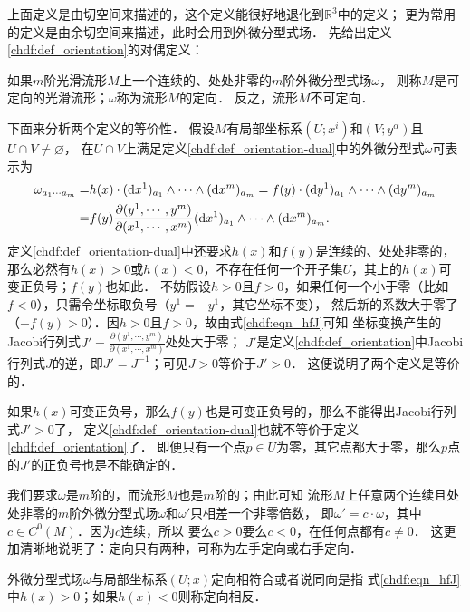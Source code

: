 上面定义是由切空间来描述的，这个定义能很好地退化到$\mathbb{R}^3$中的定义；
更为常用的定义是由余切空间来描述，此时会用到外微分型式场．
先给出定义\ref{chdf:def_orientation}的对偶定义：
\begin{definition}\label{chdf:def_orientation-dual}
    如果$m$阶光滑流形$M$上一个连续的、处处非零的$m$阶外微分型式场$\omega$，
    则称$M$是{\heiti 可定向}的光滑流形；$\omega$称为流形$M$的{\heiti 定向}．
    反之，流形$M$不可定向．
\end{definition}
下面来分析两个定义的等价性．
假设$M$有局部坐标系$(U;x^i)$和$(V;y^\alpha)$且$U\cap V\neq \varnothing$，
在$U\cap V$上满足定义\ref{chdf:def_orientation-dual}中的外微分型式$\omega$可表示为
\begin{align}
    \omega_{a_1 \cdots a_m}=&h(x)\cdot ({\rm d}x^1)_{a_1} \wedge \cdots \wedge ({\rm d}x^m)_{a_m}
      =f(y) \cdot ({\rm d}y^1)_{a_1} \wedge \cdots \wedge ({\rm d}y^m)_{a_m} \notag \\
      =& f(y)\frac{\partial (y^1,\cdots, y^m)} {\partial (x^1, \cdots, x^m)}
      ({\rm d}x^1)_{a_1} \wedge \cdots \wedge({\rm d}x^m)_{a_m}. \label{chdf:eqn_hfJ}
\end{align}
定义\ref{chdf:def_orientation-dual}中还要求$h(x)$和$f(y)$是连续的、处处非零的，
那么必然有$h(x)>0$或$h(x)<0$，不存在任何一个开子集$U$，其上的$h(x)$可变正负号；$f(y)$也如此．
不妨假设$h>0$且$f>0$，如果任何一个小于零（比如$f<0$），只需令坐标取负号（$y^1=-y^1$，其它坐标不变），
然后新的系数大于零了（$-f(y)>0$）．因$h>0$且$f>0$，故由式\eqref{chdf:eqn_hfJ}可知
坐标变换产生的Jacobi行列式$J'=\frac{\partial (y^1,\cdots, y^m)} {\partial (x^1, \cdots, x^m)}$处处大于零；
$J'$是定义\ref{chdf:def_orientation}中Jacobi行列式$J$的逆，即$J'=J^{-1}$；可见$J>0$等价于$J'>0$．
这便说明了两个定义是等价的．

如果$h(x)$可变正负号，那么$f(y)$也是可变正负号的，那么不能得出Jacobi行列式$J'>0$了，
定义\ref{chdf:def_orientation-dual}也就不等价于定义\ref{chdf:def_orientation}了．
即便只有一个点$p\in U$为零，其它点都大于零，那么$p$点的$J'$的正负号也是不能确定的．

我们要求$\omega$是$m$阶的，而流形$M$也是$m$阶的；由此可知
流形$M$上任意两个连续且处处非零的$m$阶外微分型式场$\omega$和$\omega'$只相差一个非零倍数，
即$\omega'=c\cdot \omega$，其中$c\in C^0(M)$．因为$c$连续，所以
要么$c>0$要么$c<0$，在任何点都有$c\neq 0$．
这更加清晰地说明了：定向只有两种，可称为左手定向或右手定向．

外微分型式场$\omega$与局部坐标系$(U;x)$定向相符合或者说同向是指
式\eqref{chdf:eqn_hfJ}中$h(x)>0$；如果$h(x)<0$则称定向相反．

